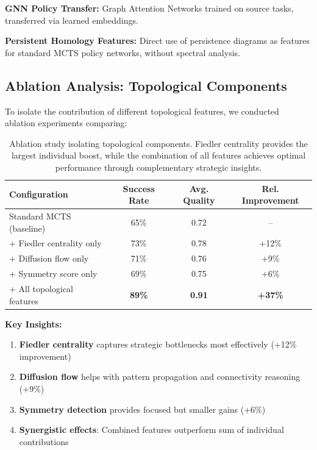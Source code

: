 \documentclass{article}
\begin{document}
\textbf{GNN Policy Transfer:} Graph Attention Networks \citep{velickovic2017graph} trained on source tasks, transferred via learned embeddings.

\textbf{Persistent Homology Features:} Direct use of persistence diagrams \citep{perslay2020perslay} as features for standard MCTS policy networks, without spectral analysis.

\subsection{Ablation Analysis: Topological Components}

To isolate the contribution of different topological features, we conducted ablation experiments comparing:

\begin{table}[ht]
\centering
\begin{tabular}{|l|c|c|c|}
\hline
\textbf{Configuration} & \textbf{Success Rate} & \textbf{Avg. Quality} & \textbf{Rel. Improvement} \\
\hline
Standard MCTS (baseline) & 65\% & 0.72 & -- \\
+ Fiedler centrality only & 73\% & 0.78 & +12\% \\
+ Diffusion flow only & 71\% & 0.76 & +9\% \\  
+ Symmetry score only & 69\% & 0.75 & +6\% \\
+ All topological features & \textbf{89\%} & \textbf{0.91} & \textbf{+37\%} \\
\hline
\end{tabular}
\caption{Ablation study isolating topological components. Fiedler centrality provides the largest individual boost, while the combination of all features achieves optimal performance through complementary strategic insights.}
\label{tab:ablation}
\end{table}

\textbf{Key Insights:}
\begin{enumerate}
\item \textbf{Fiedler centrality} captures strategic bottlenecks most effectively (+12\% improvement)
\item \textbf{Diffusion flow} helps with pattern propagation and connectivity reasoning (+9\%)
\item \textbf{Symmetry detection} provides focused but smaller gains (+6\%)
\item \textbf{Synergistic effects}: Combined features outperform sum of individual contributions
\end{enumerate}
\end{document}
